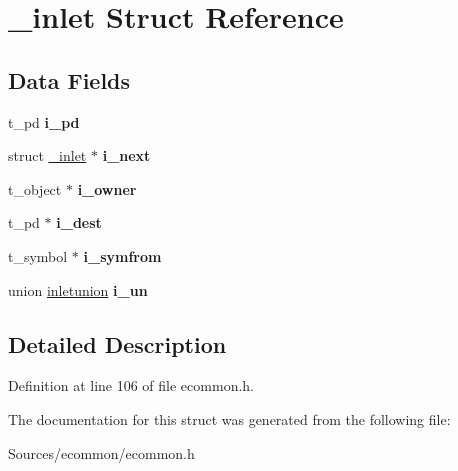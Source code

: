 \hypertarget{struct__inlet}{\section{\-\_\-inlet Struct Reference}
\label{struct__inlet}
}
\subsection*{Data Fields}
\begin{DoxyCompactItemize}
\item 
\hypertarget{struct__inlet_a2639bb3ac2a63922bf7393a675b28fd1}{t\-\_\-pd {\bfseries i\-\_\-pd}}\label{struct__inlet_a2639bb3ac2a63922bf7393a675b28fd1}

\item 
\hypertarget{struct__inlet_adb58549077d98b479e51d877e316ed31}{struct \hyperlink{struct__inlet}{\-\_\-inlet} $\ast$ {\bfseries i\-\_\-next}}\label{struct__inlet_adb58549077d98b479e51d877e316ed31}

\item 
\hypertarget{struct__inlet_aee881cb1182ca7632e843f9eb4503b30}{t\-\_\-object $\ast$ {\bfseries i\-\_\-owner}}\label{struct__inlet_aee881cb1182ca7632e843f9eb4503b30}

\item 
\hypertarget{struct__inlet_a7c16f89d729806fca332d345973b4231}{t\-\_\-pd $\ast$ {\bfseries i\-\_\-dest}}\label{struct__inlet_a7c16f89d729806fca332d345973b4231}

\item 
\hypertarget{struct__inlet_a534c2c39ea2fbb31ea35ce7eb60f8f43}{t\-\_\-symbol $\ast$ {\bfseries i\-\_\-symfrom}}\label{struct__inlet_a534c2c39ea2fbb31ea35ce7eb60f8f43}

\item 
\hypertarget{struct__inlet_a94954961ac07b15480857cece77f7065}{union \hyperlink{unioninletunion}{inletunion} {\bfseries i\-\_\-un}}\label{struct__inlet_a94954961ac07b15480857cece77f7065}

\end{DoxyCompactItemize}


\subsection{Detailed Description}


Definition at line 106 of file ecommon.\-h.



The documentation for this struct was generated from the following file\-:\begin{DoxyCompactItemize}
\item 
Sources/ecommon/ecommon.\-h\end{DoxyCompactItemize}
